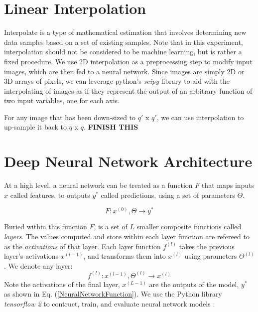 \documentclass{IEEEtran}
\begin{document}
\section{Linear Interpolation}

Interpolate is a type of mathematical estimation that involves determining new data samples based on a set of existing samples. Note that in this experiment, interpolation should not be considered to be machine learning, but is rather a fixed procedure. We use 2D interpolation as a preprocessing step to modify input images, which are then fed to a neural network. Since images are simply 2D or 3D arrays of pixels, we can leverage python's \textit{scipy} library \cite{Scipy} to aid with the interpolating of images as if they represent the output of an arbitrary function of two input variables, one for each axis.

For any image that has been down-sized to $q'$ x $q'$, we can use interpolation to up-sample it back to $q$ x $q$. \textbf{FINISH THIS}

\section{Deep Neural Network Architecture}

At a high level, a neural network can be treated as a function $F$ that maps inputs $x$ called features, to outputs $y^*$ called predictions, using a set of parameters $\Theta$. 

\begin{equation}
    \label{NeuralNetworkFunction}
    F : x^{(0)},\Theta \rightarrow y^*
\end{equation}

Buried within this function $F$, is a set of $L$ smaller composite functions called \textit{layers}. The values computed and store within each layer function are refereed to as the \textit{activations} of that layer. Each layer function $f^{(l)}$ takes the previous layer's activations $x^{(l-1)}$, and transforms them into $x^{(l)}$ using parameters $\Theta^{(l)}$ \cite{Goodfellow}. We denote any layer:
\begin{equation}
    \label{LayerFunction}
    f^{(l)} : x^{(l-1)}, \Theta^{(l)} \rightarrow x^{(l)}
\end{equation}
Note the activations of the final layer, $x^{(L-1)}$ are the outputs of the model, $y^*$ as shown in Eq. (\ref{NeuralNetworkFunction}). We use the Python library \textit{tensorflow 2} to contruct, train, and evaluate neural network models \cite{Tensorflow}.
\end{document}

